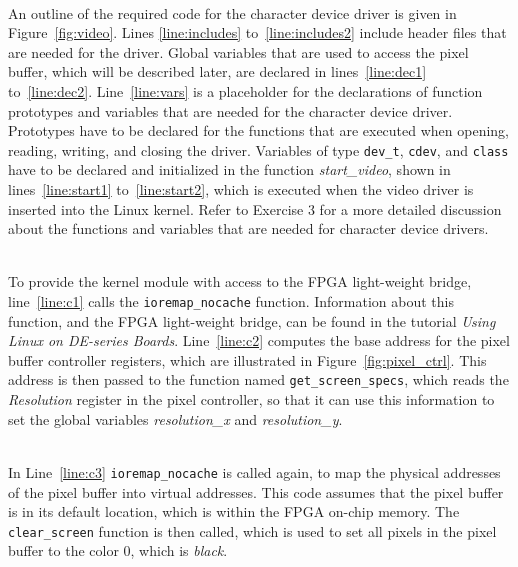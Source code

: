 \documentclass[epsfig,10pt,fullpage]{article}
\begin{document}
~\\
\noindent
An outline of the required code for the character device driver is given in 
Figure~\ref{fig:video}. Lines \ref{line:includes} to~\ref{line:includes2} include header files
that are needed for the driver. Global variables that are used to access the pixel
buffer, which will be described later, are declared in lines~\ref{line:dec1} to~\ref{line:dec2}.
Line~\ref{line:vars} is a placeholder for the declarations of function prototypes and variables
that are needed for the character device driver. Prototypes have to be declared for the functions
that are executed when opening, reading, writing, and closing the driver. Variables of type 
\texttt{dev\_t}, \texttt{cdev}, and \texttt{class} have to be declared and initialized in
the function {\it start\_video}, shown in lines~\ref{line:start1} to~\ref{line:start2},
which is executed when the video driver is inserted into the Linux kernel. Refer to Exercise 3 
for a more detailed discussion about the functions and variables that are needed for character
device drivers.

~\\
\noindent
To provide the kernel module with access to the FPGA light-weight bridge, line~\ref{line:c1} 
calls the \texttt{ioremap\_nocache} function. Information about this function, and the
FPGA light-weight bridge, can be found in the tutorial {\it Using Linux on DE-series Boards}.
Line~\ref{line:c2} computes the base address for the pixel buffer controller registers, 
which are illustrated in Figure~\ref{fig:pixel_ctrl}. This address is then passed to the
function named \texttt{get\_screen\_specs}, which reads the {\it Resolution} register in
the pixel controller, so that it can use this information to set the global variables 
{\it resolution\_x} and {\it resolution\_y}.

~\\
\noindent
In Line~\ref{line:c3} \texttt{ioremap\_nocache} is called again, to map the physical
addresses of the pixel buffer into virtual addresses. This code assumes that the pixel
buffer is in its default location, which is within the FPGA on-chip memory. The
\texttt{clear\_screen} function is then called, which is used to set all pixels in the
pixel buffer to the color 0, which is {\it black}. 
\end{document}

